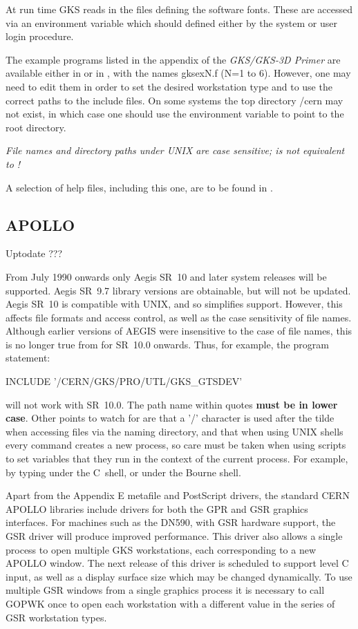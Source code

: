 At run time GKS reads in the files defining the software fonts.
These are accessed via an environment variable  which should
defined either by the system or user login procedure.
 
The example programs listed in the appendix of the
{\it GKS/GKS-3D Primer} are available either in 
or in , with the names gksexN.f (N=1 to 6).
However, one may need to edit them in order to set the desired workstation
type and to use the correct paths to the include files.
On some systems the top directory /cern may not exist, in which case
one should use the environment variable  to point to the root
directory.
\begin{note}
{\it
File names and directory paths under UNIX are case sensitive;
 is not equivalent to !}
\end{note}
 
A selection of help files, including this one, are to be found
in .
\subsection{APOLLO}
\Lit{$==>$} Uptodate ???
 
From July 1990 onwards only Aegis SR~10 and later system releases
will be supported. Aegis SR~9.7 library versions are obtainable,
but will not be updated. Aegis SR~10 is compatible with UNIX,
and so simplifies support. However, this affects file formats and access control,
as well as the case sensitivity of file names. Although earlier versions of AEGIS
were insensitive to the case of file names, this is no longer true from for
SR~10.0 onwards. Thus, for example, the program statement:
\begin{XMP}
      INCLUDE '/CERN/GKS/PRO/UTL/GKS_GTSDEV'
\end{XMP}
will not work with SR~10.0. The path name within quotes
{\bf must be in lower case}.
Other points to watch for are that a '/' character is used after the tilde
when accessing files via the naming directory,
and that when using UNIX shells every command creates a new process, so care must
be taken when using scripts to set variables that they run in the context
of the current process.
For example, by typing  under the
C~shell, or  under the Bourne shell.
 
Apart from the Appendix E metafile and PostScript drivers, the standard
CERN APOLLO libraries include drivers for both the GPR and GSR graphics
interfaces. For machines such as the DN590, with GSR hardware support,
the GSR driver will produce improved performance. This driver also
allows a single process to open multiple GKS workstations, each
corresponding to a new APOLLO window. The next release of this driver
is scheduled to support level C input, as well as a display surface size
which may be changed dynamically. To use multiple GSR windows from a single
graphics process it is necessary to call GOPWK once to open each workstation
with a different value in the series of GSR workstation types.
 
